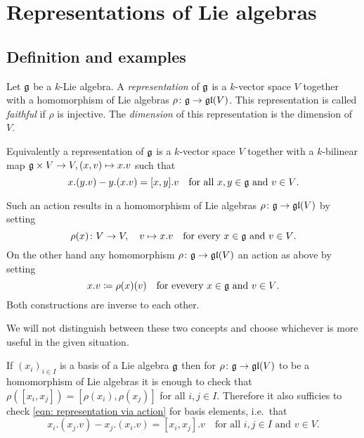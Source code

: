 \section{Representations of Lie algebras}





\subsection{Definition and examples}


\begin{defi}
 Let $\mathfrak{g}$ be a $k$-Lie algebra. A \emph{representation} of $\mathfrak{g}$ is a $k$-vector space $V$ together with a homomorphism of Lie algebras $\rho \colon \mathfrak{g} \to \mathfrak{gl}(V)$. This representation is called \emph{faithful} if $\rho$ is injective. The \emph{dimension} of this representation is the dimension of $V$.
\end{defi}


\begin{rem}
 Equivalently a representation of $\mathfrak{g}$ is a $k$-vector space $V$ together with a $k$-bilinear map $\mathfrak{g} \times V \to V, (x,v) \mapsto x.v$ such that
 \begin{equation}\label{eqn: representation via action}
  x.(y.v) - y.(x.v) = [x,y].v \quad \text{for all $x,y \in \mathfrak{g}$ and $v \in V$}.
 \end{equation}
 
 Such an action results in a homomorphism of Lie algebras $\rho \colon \mathfrak{g} \to \mathfrak{gl}(V)$ by setting
 \[
  \rho(x) \colon V \to V, \quad v \mapsto x.v
  \quad \text{for every $x \in \mathfrak{g}$ and $v \in V$}.
 \]
 On the other hand any homomorphism $\rho \colon \mathfrak{g} \to \mathfrak{gl}(V)$ an action as above by setting
 \[
  x.v \coloneqq \rho(x)(v) \quad \text{for evevery $x \in \mathfrak{g}$ and $v \in V$}.
 \]
 Both constructions are inverse to each other.

 We will not distinguish between these two concepts and choose whichever is more useful in the given situation.
\end{rem}


\begin{rem}
 If $(x_i)_{i \in I}$ is a basis of a Lie algebra $\mathfrak{g}$ then for $\rho \colon \mathfrak{g} \to \mathfrak{gl}(V)$ to be a homomorphism of Lie algebras it is enough to check that $\rho([x_i,x_j])= [\rho(x_i), \rho(x_j)]$ for all $i,j \in I$. Therefore it also sufficies to check \eqref{eqn: representation via action} for basis elements, i.e.\ that
 \[
  x_i.(x_j.v) - x_j.(x_i.v) = [x_i, x_j].v \quad \text{for all $i,j \in I$ and $v \in V$}.
 \]
\end{rem}


